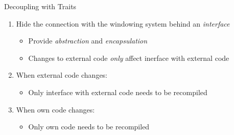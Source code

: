 \begin{rssecframe}{Decoupling with Traits}


    \begin{enumerate}

        \item Hide the connection with the windowing system behind an \textit{interface}\\
            \begin{itemize}
                \item Provide \textit{abstraction} and \textit{encapsulation}
                \item Changes to external code \textit{only} affect inerface with external code
            \end{itemize}

        \item When external code changes:\\
            \begin{itemize}
                \item Only interface with external code needs to be recompiled
            \end{itemize}

        \item When own code changes:\\
            \begin{itemize}
                \item Only own code needs to be recompiled
            \end{itemize}

    \end{enumerate}

    \vfill

\end{rssecframe}

